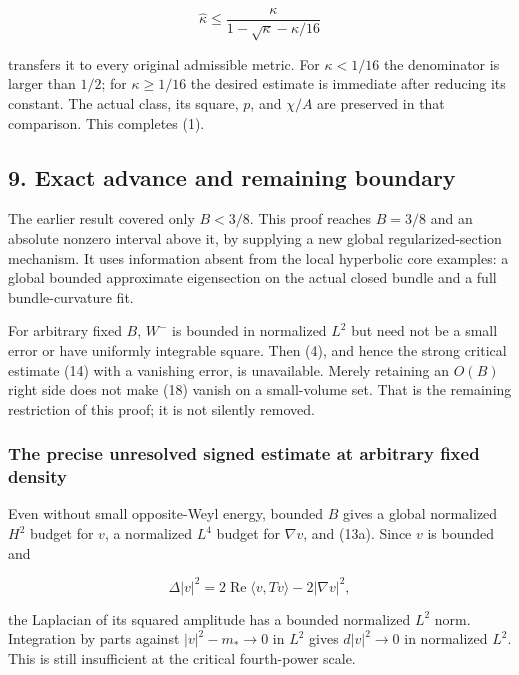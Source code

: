 \[
 \widehat\kappa\le\frac{\kappa}{1-\sqrt\kappa-\kappa/16}
\]

transfers it to every original admissible metric. For \(\kappa<1/16\)
the denominator is larger than \(1/2\); for \(\kappa\ge1/16\) the
desired estimate is immediate after reducing its constant. The actual
class, its square, \(p\), and \(\chi/A\) are preserved in that
comparison. This completes (1).

\hypertarget{o10critical:exact-advance-and-remaining-boundary}{%
\subsection{9. Exact advance and remaining
boundary}\label{o10critical:exact-advance-and-remaining-boundary}}

The earlier result covered only \(B<3/8\). This proof reaches \(B=3/8\)
and an absolute nonzero interval above it, by supplying a new global
regularized-section mechanism. It uses information absent from the local
hyperbolic core examples: a global bounded approximate eigensection on
the actual closed bundle and a full bundle-curvature fit.

For arbitrary fixed \(B\), \(W^-\) is bounded in normalized \(L^2\) but
need not be a small error or have uniformly integrable square. Then (4),
and hence the strong critical estimate (14) with a vanishing error, is
unavailable. Merely retaining an \(O(B)\) right side does not make (18)
vanish on a small-volume set. That is the remaining restriction of this
proof; it is not silently removed.

\hypertarget{o10critical:the-precise-unresolved-signed-estimate-at-arbitrary-fixed-density}{%
\subsubsection{The precise unresolved signed estimate at arbitrary fixed
density}\label{o10critical:the-precise-unresolved-signed-estimate-at-arbitrary-fixed-density}}

Even without small opposite-Weyl energy, bounded \(B\) gives a global
normalized \(H^2\) budget for \(v\), a normalized \(L^4\) budget for
\(\nabla v\), and (13a). Since \(v\) is bounded and

\[
 \Delta|v|^2=2\operatorname{Re}\langle v,Tv\rangle-2|\nabla v|^2,
\]

the Laplacian of its squared amplitude has a bounded normalized \(L^2\)
norm. Integration by parts against \(|v|^2-m_*\to0\) in \(L^2\) gives
\(d|v|^2\to0\) in normalized \(L^2\). This is still insufficient at the
critical fourth-power scale.

